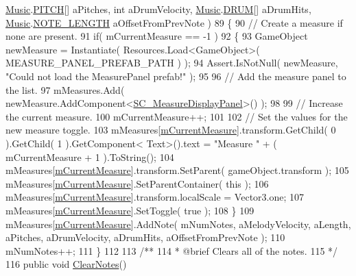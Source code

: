 \begin{DoxyCodeInclude}
      \hyperlink{class_music}{Music}.\hyperlink{group___music_enums_ga508f69b199ea518f935486c990edac1d}{PITCH}[] aPitches, \textcolor{keywordtype}{int} aDrumVelocity, \hyperlink{class_music}{Music}.\hyperlink{group___music_enums_gade475b4382c7066d1af13e7c13c029b6}{DRUM}[] aDrumHits, 
      \hyperlink{class_music}{Music}.\hyperlink{group___music_enums_gaf11b5f079adbb21c800b9eca1c5c3cbd}{NOTE\_LENGTH} aOffsetFromPrevNote )
89     \{
90         \textcolor{comment}{// Create a measure if none are present.}
91         \textcolor{keywordflow}{if}( mCurrentMeasure == -1 )
92         \{
93             GameObject newMeasure = Instantiate( Resources.Load<GameObject>( MEASURE\_PANEL\_PREFAB\_PATH ) );
94             Assert.IsNotNull( newMeasure, \textcolor{stringliteral}{"Could not load the MeasurePanel prefab!"} );
95 
96             \textcolor{comment}{// Add the measure panel to the list.}
97             mMeasures.Add( newMeasure.AddComponent<\hyperlink{class_s_c___measure_display_panel}{SC\_MeasureDisplayPanel}>() );
98 
99             \textcolor{comment}{// Increase the current measure.}
100             mCurrentMeasure++;
101 
102             \textcolor{comment}{// Set the values for the new measure toggle.}
103             mMeasures[\hyperlink{group___s_c___n_d_c_priv_var_ga28ce2bf8358c9f686b5b9e362aa96dff}{mCurrentMeasure}].transform.GetChild( 0 ).GetChild( 1 ).GetComponent<
      Text>().text = \textcolor{stringliteral}{"Measure "} + ( mCurrentMeasure + 1 ).ToString();
104             mMeasures[\hyperlink{group___s_c___n_d_c_priv_var_ga28ce2bf8358c9f686b5b9e362aa96dff}{mCurrentMeasure}].transform.SetParent( gameObject.transform );
105             mMeasures[\hyperlink{group___s_c___n_d_c_priv_var_ga28ce2bf8358c9f686b5b9e362aa96dff}{mCurrentMeasure}].SetParentContainer( \textcolor{keyword}{this} );
106             mMeasures[\hyperlink{group___s_c___n_d_c_priv_var_ga28ce2bf8358c9f686b5b9e362aa96dff}{mCurrentMeasure}].transform.localScale = Vector3.one;
107             mMeasures[\hyperlink{group___s_c___n_d_c_priv_var_ga28ce2bf8358c9f686b5b9e362aa96dff}{mCurrentMeasure}].SetToggle( \textcolor{keyword}{true} );
108         \}
109         mMeasures[\hyperlink{group___s_c___n_d_c_priv_var_ga28ce2bf8358c9f686b5b9e362aa96dff}{mCurrentMeasure}].AddNote( mNumNotes, aMelodyVelocity, aLength, aPitches, 
      aDrumVelocity, aDrumHits, aOffsetFromPrevNote );
110         mNumNotes++;
111     \}
112 \textcolor{comment}{}
113 \textcolor{comment}{    /** }
114 \textcolor{comment}{     * @brief Clears all of the notes.}
115 \textcolor{comment}{    */}
116     \textcolor{keyword}{public} \textcolor{keywordtype}{void} \hyperlink{group___s_c___n_d_c_pub_func_gaa344983500e83531210ae1c4789182f3}{ClearNotes}()

\end{DoxyCodeInclude}
